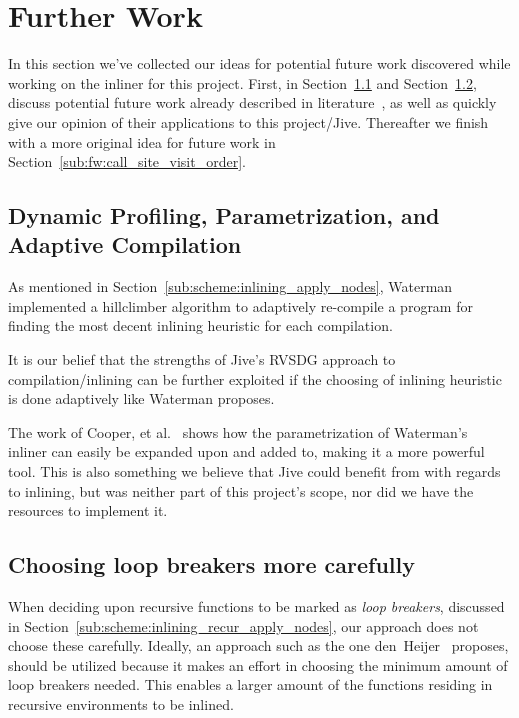 
\clearpage
\section{Further Work}
\label{sec:further_work}

In this section we've collected our ideas for potential future work discovered
while working on the inliner for this project. First, in
Section~\ref{sub:fw:adaptiv_comp} and
Section~\ref{sub:fw:optimal_loop_breakers}, discuss potential future work
already described in
literature~\cite{AdaptvStratInlSubst,AdaptvCompilAndInlingWaterman,BasMscThesis}, as well as quickly give our opinion of their applications
to this project/Jive. Thereafter we finish with a more original idea for future
work in Section~\ref{sub:fw:call_site_visit_order}.

\subsection{Dynamic Profiling, Parametrization, and Adaptive Compilation}
\label{sub:fw:adaptiv_comp}

As mentioned in Section~\ref{sub:scheme:inlining_apply_nodes},
Waterman~\cite{AdaptvCompilAndInlingWaterman} implemented a hillclimber
algorithm to adaptively re-compile a program for finding the most decent
inlining heuristic for each compilation.

It is our belief that the strengths of Jive's RVSDG approach to
compilation/inlining can be further exploited if the choosing of inlining
heuristic is done adaptively like Waterman proposes.

The work of Cooper, et al.~\cite{AdaptvStratInlSubst} shows how the
parametrization of Waterman's~\cite{AdaptvCompilAndInlingWaterman} inliner can
easily be expanded upon and added to, making it a more powerful tool. This is
also something we believe that Jive could benefit from with regards to inlining,
but was neither part of this project's scope, nor did we have the resources to
implement it.

\subsection{Choosing loop breakers more carefully}
\label{sub:fw:optimal_loop_breakers}

When deciding upon recursive functions to be marked as \textit{loop breakers},
discussed in Section~\ref{sub:scheme:inlining_recur_apply_nodes}, our approach
does not choose these carefully. Ideally, an approach such as the one
den~Heijer~\cite{BasMscThesis} proposes, should be utilized because it makes an
effort in choosing the minimum amount of loop breakers needed. This enables a
larger amount of the functions residing in recursive environments to be inlined.

